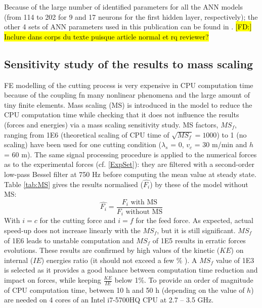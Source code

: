 \documentclass[preprint,12pt,times]{elsarticle}
\DeclareRobustCommand{\FD}[1]{ {\begingroup\sethlcolor{VWgreen}\textcolor{black}{\hl{[FD:] #1}}\endgroup} }
\begin{document}
Because of the large number of identified parameters for all the ANN models (from 114 to 202 for 9 and 17 neurons for the first hidden layer, respectively); the other 4 sets of ANN parameters used in this publication can be found in \cite{pantale_Coefficients_2022}.\FD{Inclure dans corps du texte puisque article normal et rq reviewer?}

\subsection{Sensitivity study of the results to mass scaling}

FE modelling of the cutting process is very expensive in CPU computation time because of the coupling fn many nonlinear phenomena and the large amount of tiny finite elements. Mass scaling (MS) is introduced in the model to reduce the CPU computation time while checking that it does not influence the results (forces and energies) via a mass scaling sensitivity study.
MS factors, ${MS}_f$, ranging from 1E6 (theoretical scaling of CPU time of $\sqrt{{MS}_f} = 1000$) to 1 (no scaling) have been used for one cutting condition ($\lambda_s$ = 0\textdegree{}, $v_c$ = 30 m/min and $h$ = 60 \textmu{}m). The same signal processing procedure is applied to the numerical forces as to the experimental forces (cf. \ref{ExpSet}): they are filtered with a second-order low-pass Bessel filter at 750 Hz before computing the mean value at steady state. Table \ref{tab:MS} gives the results normalised ($\hat{F_i}$) by these of the model without MS:
%
\begin{equation}
\hat{F_i} = \frac{F_i\text{ with MS}}{F_i\text{ without MS}}
\end{equation}
%
With $i = c$ for the cutting force and $i = f$ for the feed force. As expected, actual speed-up does not increase linearly with the ${MS}_f$, but it is still significant. ${MS}_f$ of 1E6 leads to unstable computation and ${MS}_f$ of 1E5 results in erratic forces evolutions. These results are confirmed by high values of the kinetic ($KE$) on internal ($IE$) energies ratio (it should not exceed a few \% \cite{wang_Investigation_2011, ducobu_Introduction_2015}). A ${MS}_f$ value of 1E3 is selected as it provides a good balance between computation time reduction and impact on forces, while keeping $\frac{KE}{IE}$ below 1\%. To provide an order of magnitude of CPU computation time, between 10 h and 50 h (depending on the value of $h$) are needed on 4 cores of an Intel i7-5700HQ CPU at 2.7 -- 3.5 GHz.
\end{document}
